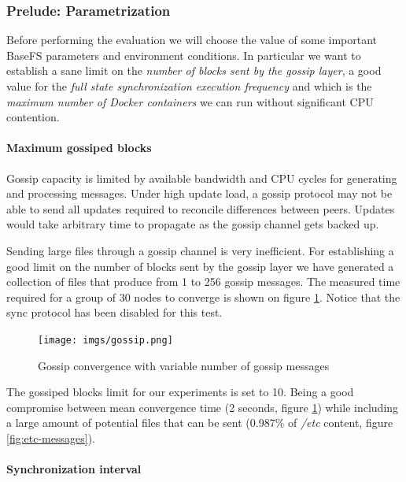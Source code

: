 \documentclass{sig-alternate}
\begin{document}
\subsubsection{Prelude: Parametrization}

Before performing the evaluation we will choose the value of some important BaseFS parameters and environment conditions. In particular we want to establish a sane limit on the \textit{number of blocks sent by the gossip layer}, a good value for the \textit{full state synchronization execution frequency} and which is the \textit{maximum number of Docker containers} we can run without significant CPU contention.


\paragraph{Maximum gossiped blocks}

Gossip capacity is limited by available bandwidth and CPU cycles for generating and processing messages. Under high update load, a gossip protocol may not be able to send all updates required to reconcile differences between peers. Updates would take arbitrary time to propagate as the gossip channel gets backed up. \cite{van2008efficient}

Sending large files through a gossip channel is very inefficient. For establishing a good limit on the number of blocks sent by the gossip layer we have generated a collection of files that produce from 1 to 256 gossip messages. The measured time required for a group of 30 nodes to converge is shown on figure \ref{fig:gossip}. Notice that the sync protocol has been disabled for this test.

\begin{figure}
\centering
\texttt{[image: imgs/gossip.png]}
\caption{Gossip convergence with variable number of gossip messages}
\label{fig:gossip}
\end{figure}

The gossiped blocks limit for our experiments is set to 10. Being a good compromise between mean convergence time (2 seconds, figure \ref{fig:gossip}) while including a large amount of potential files that can be sent (0.987\% of \textit{/etc} content, figure   \ref{fig:etc-messages}).


\paragraph{Synchronization interval}
\end{document}
